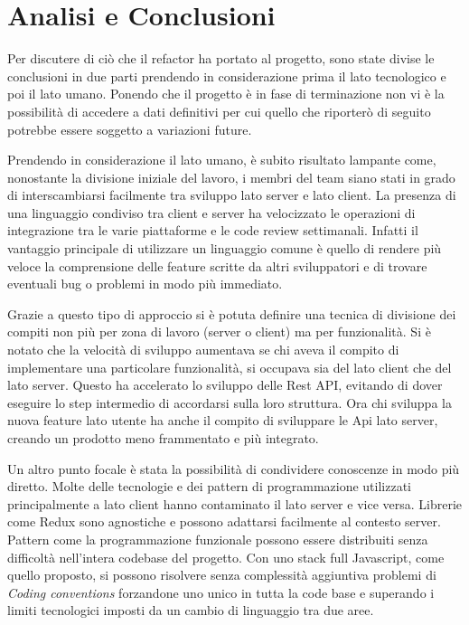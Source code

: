 \chapter{Analisi e Conclusioni}
\label{cha:intro}
\vspace{5mm}

Per discutere di ciò che il refactor ha portato al progetto, sono state divise le conclusioni in due parti prendendo in considerazione prima il lato tecnologico e poi il lato umano. Ponendo che il progetto è in fase di terminazione non vi è la possibilità di accedere a dati definitivi per cui quello che riporterò di seguito potrebbe essere soggetto a variazioni future.\vspace{5mm}

Prendendo in considerazione il lato umano, è subito risultato lampante come, nonostante la divisione iniziale del lavoro, i membri del team siano stati in grado di interscambiarsi facilmente tra sviluppo lato server e lato client. La presenza di una linguaggio condiviso tra client e server ha velocizzato le operazioni di integrazione tra le varie piattaforme e le code review settimanali. Infatti il vantaggio principale di utilizzare un linguaggio comune è quello di rendere più veloce la comprensione delle feature scritte da altri sviluppatori e di trovare eventuali bug o problemi in modo più immediato.\vspace{5mm}

Grazie a questo tipo di approccio si è potuta definire una tecnica di divisione dei compiti non più per zona di lavoro (server o client) ma per funzionalità. Si è notato che la velocità di sviluppo aumentava se chi aveva il compito di implementare una particolare funzionalità, si occupava sia del lato client che del lato server. Questo ha accelerato lo sviluppo delle Rest API, evitando di dover eseguire lo step intermedio di accordarsi sulla loro struttura. Ora chi sviluppa la nuova feature lato utente ha anche il compito di sviluppare le Api lato server, creando un prodotto meno frammentato e più integrato. \vspace{5mm}

Un altro punto focale è stata la possibilità di condividere conoscenze in modo più diretto. Molte delle tecnologie e dei pattern di programmazione utilizzati principalmente a lato client hanno contaminato il lato server e vice versa. Librerie come Redux sono agnostiche e possono adattarsi facilmente al contesto server. Pattern come la programmazione funzionale possono essere distribuiti senza difficoltà nell'intera codebase del progetto. Con uno stack full Javascript, come quello proposto, si possono risolvere senza complessità aggiuntiva problemi di \emph{Coding conventions} forzandone uno unico in tutta la code base e superando i limiti tecnologici imposti da un cambio di linguaggio tra due aree.\vspace{5mm}

